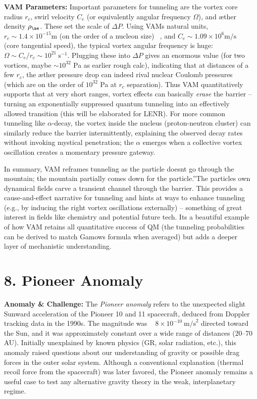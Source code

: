 \documentclass[a4paper, aps,preprint,superscriptaddress, 12pt]{revtex4}
\begin{document}
\textbf{VAM Parameters:} Important parameters for tunneling are the vortex core radius $r_c$, swirl velocity $C_e$ (or equivalently angular frequency $\Omega$), and æther density $\rho_{\ae}$. These set the scale of $\Delta P$. Using VAM\rqs s natural units, $r_c\sim1.4\times10^{-15}\text{m}$ (on the order of a nucleon size)~\cite{VAM_constants} , and $C_e\sim1.09\times10^6\text{m/s}$~\cite{VAM_constants}  (core tangential speed), the typical vortex angular frequency is huge: $\Omega \sim C_e/r_c \sim 10^{21}~\text{s}^{-1}$. Plugging these into $\Delta P$ gives an enormous value (for two vortices, maybe $\sim10^{32}$ Pa as earlier rough calc), indicating that at distances of a few $r_c$, the æther pressure drop can indeed rival nuclear Coulomb pressures (which are on the order of $10^{32}$ Pa at $r_c$ separation). Thus VAM quantitatively supports that at very short ranges, vortex effects can basically \textit{erase} the barrier – turning an exponentially suppressed quantum tunneling into an effectively allowed transition (this will be elaborated for LENR). For more common tunneling like $\alpha$-decay, the vortex inside the nucleus (proton-neutron cluster) can similarly reduce the barrier intermittently, explaining the observed decay rates without invoking mystical penetration; the $\alpha$ emerges when a collective vortex oscillation creates a momentary pressure gateway.


In summary, VAM reframes tunneling as \grqq the particle doesn\rqs t go through the mountain; the mountain partially comes down for the particle.\textquotedblright The particle\rqs s own dynamical fields carve a transient channel through the barrier. This provides a cause-and-effect narrative for tunneling and hints at ways to enhance tunneling (e.g., by inducing the right vortex oscillations externally) – something of great interest in fields like chemistry and potential future tech. It\rqs s a beautiful example of how VAM retains all quantitative success of QM (the tunneling probabilities can be derived to match Gamow\rqs s formula when averaged) but adds a deeper layer of mechanistic understanding.


\section*{8. Pioneer Anomaly}

\textbf{Anomaly \& Challenge: } The \textit{Pioneer anomaly} refers to the unexpected slight Sunward acceleration of the Pioneer 10 and 11 spacecraft, deduced from Doppler tracking data in the 1990s. The magnitude was ~ $8\times10^{-10}~\text{m/s}^2$ directed toward the Sun, and it was approximately constant over a wide range of distances (20–70 AU). Initially unexplained by known physics (GR, solar radiation, etc.), this anomaly raised questions about our understanding of gravity or possible drag forces in the outer solar system. Although a conventional explanation (thermal recoil force from the spacecraft) was later favored, the Pioneer anomaly remains a useful case to test any alternative gravity theory in the weak, interplanetary regime.
\end{document}
